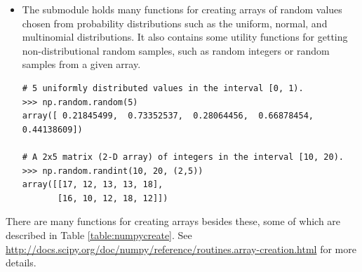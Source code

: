 \begin{itemize}
\item The submodule  holds many functions for creating arrays of random values chosen from probability distributions such as the uniform, normal, and multinomial distributions.
It also contains some utility functions for getting non-distributional random samples, such as random integers or random samples from a given array.

\begin{lstlisting}
# 5 uniformly distributed values in the interval [0, 1).
>>> np.random.random(5)
array([ 0.21845499,  0.73352537,  0.28064456,  0.66878454,  0.44138609])

# A 2x5 matrix (2-D array) of integers in the interval [10, 20).
>>> np.random.randint(10, 20, (2,5))
array([[17, 12, 13, 13, 18],
       [16, 10, 12, 18, 12]])
\end{lstlisting} 

\end{itemize}



There are many functions for creating arrays besides these, some of which are described in Table \ref{table:numpycreate}. 
See \url{http://docs.scipy.org/doc/numpy/reference/routines.array-creation.html} for more details.

